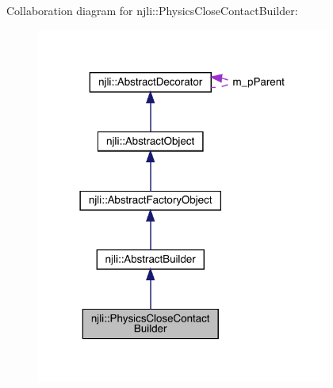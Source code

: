 Collaboration diagram for njli\+:\+:Physics\+Close\+Contact\+Builder\+:\nopagebreak
\begin{figure}[H]
\begin{center}
\leavevmode
\includegraphics[width=273pt]{classnjli_1_1_physics_close_contact_builder__coll__graph}
\end{center}
\end{figure}
